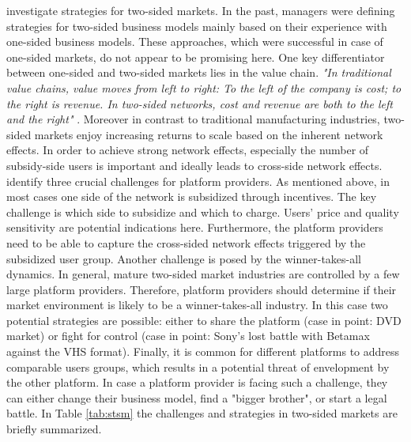 \citet{Eisenmann2006} investigate strategies for two-sided markets. In the past, managers were defining strategies for two-sided business models mainly based on their experience with one-sided business models. These approaches, which were successful in case of one-sided markets, do not appear to be promising here. One key differentiator between one-sided and two-sided markets lies in the value chain. \textit{"In traditional value chains, value moves from left to right: To the left of the company is cost; to the right is revenue. In two-sided networks, cost and revenue are both to the left and the right"} \citep[p. 94]{Eisenmann2006}. Moreover in contrast to traditional manufacturing industries, two-sided markets enjoy increasing returns to scale based on the inherent network effects. In order to achieve strong network effects, especially the number of subsidy-side users is important and ideally leads to cross-side network effects. \citet{Eisenmann2006} identify three crucial challenges for platform providers. As mentioned above, in most cases one side of the network is subsidized through incentives. The key challenge is which side to subsidize and which to charge. Users' price and quality sensitivity are potential indications here. Furthermore, the platform providers need to be able to capture the cross-sided network effects triggered by the subsidized user group. Another challenge is posed by the winner-takes-all dynamics. In general, mature two-sided market industries are controlled by a few large platform providers. Therefore, platform providers should determine if their market environment is likely to be a winner-takes-all industry. In this case two potential strategies are possible: either to share the platform (case in point: \ac{DVD} market) or fight for control (case in point: Sony's lost battle with Betamax against the \ac{VHS} format). Finally, it is common for different platforms to address comparable users groups, which results in a potential threat of envelopment by the other platform. In case a platform provider is facing such a challenge, they can either change their business model, find a "bigger brother", or start a legal battle. In Table \ref{tab:stsm} the challenges and strategies in two-sided markets are briefly summarized.

